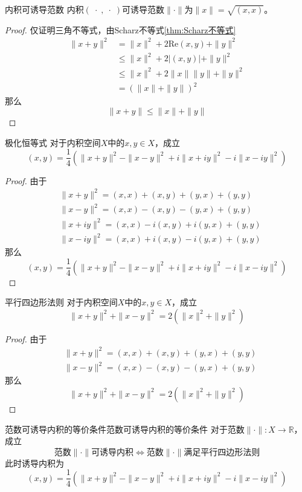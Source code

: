 \documentclass[lang = cn, scheme = chinese, thmcnt = section]{elegantbook}
\newcommand{\R}{\mathbb{R}}            %
\begin{document}
\begin{theorem}{内积可诱导范数}
	内积$(\;\cdot\;,\;\cdot\;)$可诱导范数$\|\cdot\|$为$\|x\|=\sqrt{(x,x)}$。
\end{theorem}

\begin{proof}
	仅证明三角不等式，由Scharz不等式\ref{thm:Scharz不等式}
	\begin{align*}
		\|x+y\|^2
		&= \|x\|^2+2\text{Re}(x,y)+\|y\|^2\\
		&\le \|x\|^2+2|(x,y)|+\|y\|^2\\
		&\le \|x\|^2+2\|x\|\|y\|+\|y\|^2\\
		&= (\|x\|+\|y\|)^2
	\end{align*}
	那么
	\[ 
	\|x+y\|\le \|x\|+\|y\|
	 \]
\end{proof}

\begin{theorem}{极化恒等式}
	对于内积空间$X$中的$x,y\in X$，成立
	$$
	(x,y)=\frac{1}{4}(\|x+y\|^2 - \|x-y\|^2 + i\|x+iy\|^2 - i\|x-iy\|^2)
	$$
\end{theorem}

\begin{proof}
	由于
	\begin{align*}
		& \|x+y\|^2=(x,x)+(x,y)+(y,x)+(y,y)\\
		& \|x-y\|^2=(x,x)-(x,y)-(y,x)+(y,y)\\
		& \|x+iy\|^2=(x,x)-i(x,y)+i(y,x)+(y,y)\\
		& \|x-iy\|^2=(x,x)+i(x,y)-i(y,x)+(y,y)
	\end{align*}
	那么
	$$
	(x,y)=\frac{1}{4}(\|x+y\|^2 - \|x-y\|^2 + i\|x+iy\|^2 - i\|x-iy\|^2)
	$$
\end{proof}

\begin{theorem}{平行四边形法则}
	对于内积空间$X$中的$x,y\in X$，成立
	$$
	\|x+y\|^2+\|x-y\|^2=2(\|x\|^2+\|y\|^2)
	$$
\end{theorem}

\begin{proof}
	由于
	\begin{align*}
		& \|x+y\|^2=(x,x)+(x,y)+(y,x)+(y,y)\\
		& \|x-y\|^2=(x,x)-(x,y)-(y,x)+(y,y)
	\end{align*}
	那么
	$$
	\|x+y\|^2+\|x-y\|^2=2(\|x\|^2+\|y\|^2)
	$$
\end{proof}

\begin{theorem}{范数可诱导内积的等价条件}{范数可诱导内积的等价条件}
	对于范数$\| \cdot\|:X\to\R$，成立
	$$
	\text{范数}\|\cdot\|\text{可诱导内积}\iff 
	\text{范数}\|\cdot\|\text{满足平行四边形法则}
	$$
	此时诱导内积为
	$$
	(x,y)=\frac{1}{4}(\|x+y\|^2 - \|x-y\|^2 + i\|x+iy\|^2 - i\|x-iy\|^2)
	$$
\end{theorem}
\end{document}
